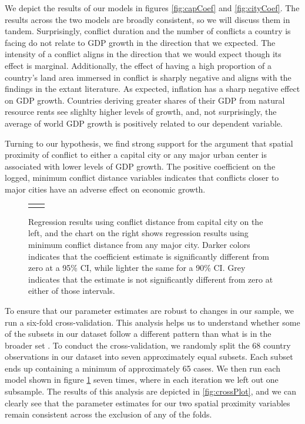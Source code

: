We depict the results of our models in figures \ref{fig:capCoef} and \ref{fig:cityCoef}. The results across the two models are broadly consistent, so we will discuss them in tandem. Surprisingly, conflict duration and the number of conflicts a country is facing do not relate to GDP growth in the direction that we expected. The intensity of a conflict aligns in the direction that we would expect though its effect is marginal. Additionally, the effect of having a high proportion of a country's land area immersed in conflict is sharply negative and aligns with the findings in the extant literature. As expected, inflation has a sharp negative effect on GDP growth. Countries deriving greater shares of their GDP from natural resource rents see slighlty higher levels of growth, and, not surprisingly, the average of world GDP growth is positively related to our dependent variable.

Turning to our hypothesis, we find strong support for the argument that spatial proximity of conflict to either a capital city or any major urban center is associated with lower levels of GDP growth. The positive coefficient on the logged, minimum conflict distance variables indicates that conflicts closer to major cities have an adverse effect on economic growth. 

\begin{figure}
	\centering
	\begin{tabular}{cc}
		\subfloat[SubFigure 1][Capital City]{
			\resizebox{.45\textwidth}{!}{}
		\label{fig:capCoef}} &
		\subfloat[SubFigure 2][Any Major City]{
			\resizebox{.45\textwidth}{!}{}
		\label{fig:cityCoef}}
	\end{tabular}
	\caption{Regression results using conflict distance from capital city on the left, and the chart on the right shows regression results using minimum conflict distance from any major city. Darker colors indicates that the coefficient estimate is significantly different from zero at a 95\% CI, while lighter the same for a 90\% CI. Grey indicates that the estimate is not significantly different from zero at either of those intervals.}
	\label{fig:coefplot}
\end{figure}

To ensure that our parameter estimates are robust to changes in our sample, we run a six-fold cross-validation. This analysis helps us to understand whether some of the subsets in our dataset follow a different pattern than what is in the broader set \citep{beck2008time}. To conduct the cross-validation, we randomly split the 68 country observations in our dataset into seven approximately equal subsets. Each subset ends up containing a minimum of approximately 65 cases. We then run each model shown in figure \ref{fig:coefplot} seven times, where in each iteration we left out one subsample. The results of this analysis are depicted in \ref{fig:crossPlot}, and we can clearly see that the parameter estimates for our two spatial proximity variables remain consistent across the exclusion of any of the folds.

